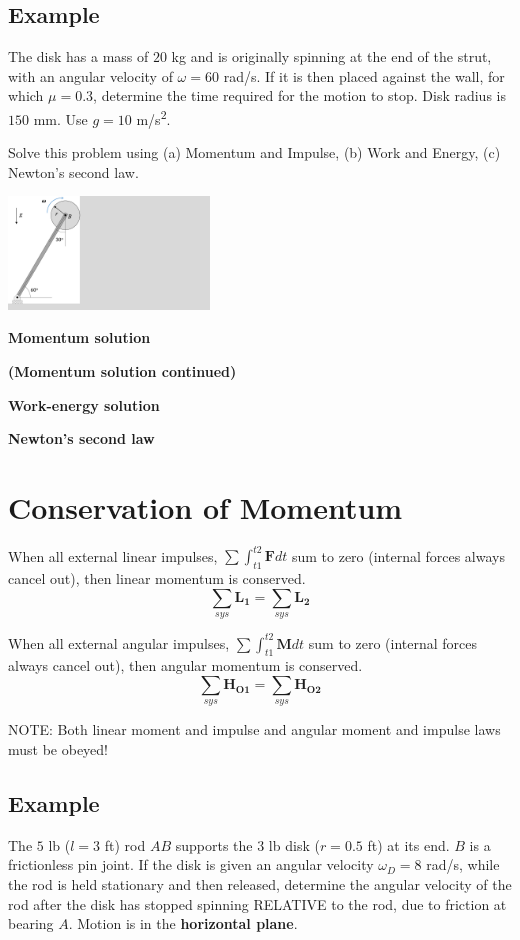 \documentclass[12pt,letterpaper,twoside]{report}
\begin{document}
\newpage

\subsection{Example}
The disk has a mass of $20$ kg and is originally spinning at the end of the strut, with an angular velocity of $\omega=60$ rad/s.  If it is then placed against the wall, for which $\mu = 0.3$, determine the time required for the motion to stop. Disk radius is $150$ mm.  Use $g = 10$ m/s\textsuperscript{2}. 

Solve this problem using (a) Momentum and Impulse, (b) Work and Energy, (c) Newton’s second law.

\includegraphics[trim={0cm 0cm 20cm 0cm},clip,width=0.4\textwidth, left]{Slide102}

\textbf{Momentum solution}

\newpage
\textbf{(Momentum solution continued)}

\newpage
\textbf{Work-energy solution}

\newpage
\textbf{Newton's second law}

\newpage

\section{Conservation of Momentum}
When all external linear impulses, $\displaystyle \sum \int_{t1}^{t2} \bm{F} dt$ sum to zero (internal forces always cancel out), then linear momentum is conserved. 
\[ \sum_{sys} \bm{L_1} = \sum_{sys} \bm{L_2} \]
\vspace*{9\baselineskip}

When all external angular impulses, $\displaystyle \sum \int_{t1}^{t2} \bm{M} dt$ sum to zero (internal forces always cancel out), then angular momentum is conserved. 
\[ \sum_{sys} \bm{H_{O1}} = \sum_{sys} \bm{H_{O2}} \]
\vspace*{9\baselineskip}

NOTE:  Both linear moment and impulse and angular moment and impulse laws must be obeyed!

\newpage
\subsection{Example}
The $5$ lb ($l = 3$ ft) rod $AB$ supports the $3$ lb disk ($r = 0.5$ ft) at its end.  $B$ is a frictionless pin joint.  If the disk is given an angular velocity $\omega_D = 8$ rad/s, while the rod is held stationary and then released, determine the angular velocity of the rod after the disk has stopped spinning RELATIVE to the rod, due to friction at bearing $A$.  Motion is in the \textbf{horizontal plane}.  
\end{document}
